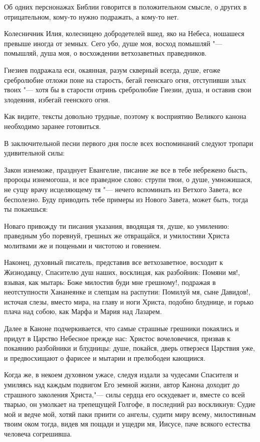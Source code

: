 Об одних перснонажах Библии говорится в положительном смысле, о других в отрицательном, кому-то нужно подражать, а кому-то нет.


Колесничник Илия, колесницею добродетелей вшед, яко на Небеса, ношашеся превыше иногда от земных. Сего убо, душе моя, восход помышляй "--- помышляй, душа моя, о восхождении ветхозаветных праведников.


Гиезиев подражала еси, окаянная, разум скверный всегда, душе, егоже сребролюбие отложи поне на старость, бегай геенскаго огня, отступивши злых твоих "--- хотя бы в старости отринь сребролюбие Гиезии, душа, и оставив свои злодеяния, избегай геенского огня.


Как видите, тексты довольно трудные, поэтому к восприятию Великого канона необходимо заранее готовиться.


В заключительной песни первого дня после всех воспоминаний следуют тропари удивительной силы:


Закон изнеможе, празднует Евангелие, писание же все в тебе небрежено бысть, пророцы изнемогоша, и все праведное слово: струпи твои, о душе, умножишася, не сущу врачу исцеляющему тя "--- нечего вспоминать из Ветхого Завета, все бесполезно. Буду приводить тебе примеры из Нового Завета, может быть, тогда ты покаешься:


Новаго привожду ти писания указания, вводящая тя, душе, ко умилению: праведным убо поревнуй, грешных же отвращайся, и умилостиви Христа молитвами же и пощеньми и чистотою и говением.


Наконец, духовный писатель, представив все ветхозаветное, восходит к Жизнодавцу, Спасителю душ наших, восклицая, как разбойник: Помяни мя!, взывая, как мытарь: Боже милостив буди мне грешному!, подражая в неотступности Хананеянке и слепцам на распутии: Помилуй мя, сыне Давидов!, источая слезы, вместо мира, на главу и ноги Христа, подобно блуднице, и горько плача над собою, как Марфа и Мария над Лазарем.


Далее в Каноне подчеркивается, что самые страшные грешники покаялись и придут в Царство Небесное прежде нас: Христос вочеловечися, призвав к покаянию разбойники и блудницы: душе, покайся, дверь отверзеся Царствия уже, и предвосхищают о фарисее и мытарии и прелюбодеи кающиися.


Когда же, в некоем духовном ужасе, следуя издали за чудесами Спасителя и умиляясь над каждым подвигом Его земной жизни, автор Канона доходит до страшного заколения Христа,"--- силы сердца его оскудевает и, вместе со всей тварью, он умолкает на трепещущей Голгофе, в последний раз воскликнув: Судие мой и ведче мой, хотяй паки приити со ангелы, судити миру всему, милостивным твоим оком тогда, видев мя пощади и ущедри мя, Иисусе, паче всякого естества человеча согрешивша.


